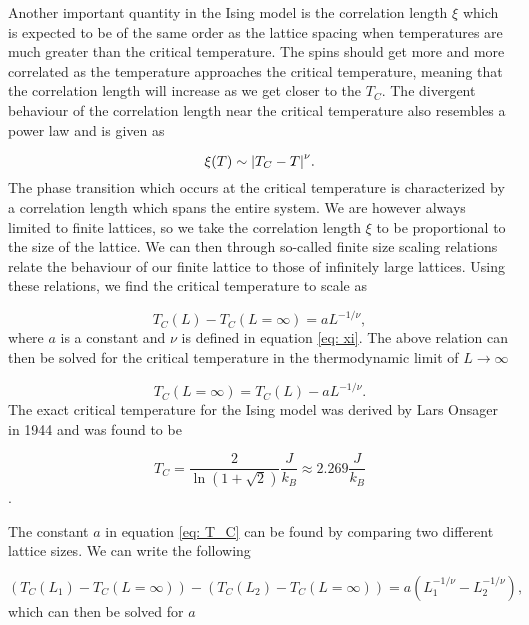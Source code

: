 \documentclass[a4paper, 10pt, reqno]{amsart}
\begin{document}
Another important quantity in the Ising model is the correlation length $\xi$ which is expected to be of the same order as the lattice spacing when temperatures are much greater than the critical temperature. The spins should get more and more correlated as the temperature approaches the critical temperature, meaning that the correlation length will increase as we get closer to the $T_C$. The divergent behaviour of the correlation length near the critical temperature also resembles a power law and is given as

\begin{equation}\label{eq: xi}
    \xi(T) \sim \abs{T_C - T}^\nu.
\end{equation}
The phase transition which occurs at the critical temperature is characterized by a correlation length which spans the entire system. We are however always limited to finite lattices, so we take the correlation length $\xi$ to be proportional to the size of the lattice. We can then through so-called finite size scaling relations relate the behaviour of our finite lattice to those of infinitely large lattices. Using these relations, we find the critical temperature to scale as

\begin{equation}\label{eq: T_C scale}
    T_C(L) - T_C(L = \infty) = aL^{-1/\nu},
\end{equation}
where $a$ is a constant and $\nu$ is defined in equation \eqref{eq: xi}. The above relation can then be solved for the critical temperature in the thermodynamic limit of $L \rightarrow \infty$

\begin{equation}\label{eq: T_C}
    T_C(L=\infty) =T_C(L) - aL^{-1/\nu}.
\end{equation}
The exact critical temperature for the Ising model was derived by Lars Onsager in 1944 and was found to be

\begin{equation}
    T_C = \frac{2}{\ln(1 + \sqrt{2})}\frac{J}{k_B} \approx 2.269\frac{J}{k_B}
\end{equation}.

The constant $a$ in equation \eqref{eq: T_C} can be found by comparing two different lattice sizes. We can write the following

\begin{equation}
    \left( T_C(L_1) - T_C(L = \infty) \right)-\left( T_C(L_2) - T_C(L = \infty) \right) = a(L_1^{-1/\nu} - L_2^{-1/\nu}),
\end{equation}
which can then be solved for $a$
\end{document}
